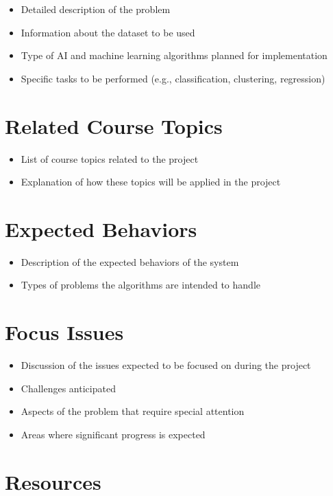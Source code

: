 \documentclass{article}
\begin{document}
\begin{itemize}
    \item Detailed description of the problem
    \item Information about the dataset to be used
    \item Type of AI and machine learning algorithms planned for implementation
    \item Specific tasks to be performed (e.g., classification, clustering,
          regression)
\end{itemize}

\section{Related Course Topics}

\begin{itemize}
    \item List of course topics related to the project
    \item Explanation of how these topics will be applied in the project
\end{itemize}

\section{Expected Behaviors}

\begin{itemize}
    \item Description of the expected behaviors of the system
    \item Types of problems the algorithms are intended to handle
\end{itemize}

\section{Focus Issues}

\begin{itemize}
    \item Discussion of the issues expected to be focused on during the project
    \item Challenges anticipated
    \item Aspects of the problem that require special attention
    \item Areas where significant progress is expected
\end{itemize}

\section{Resources}
\end{document}
